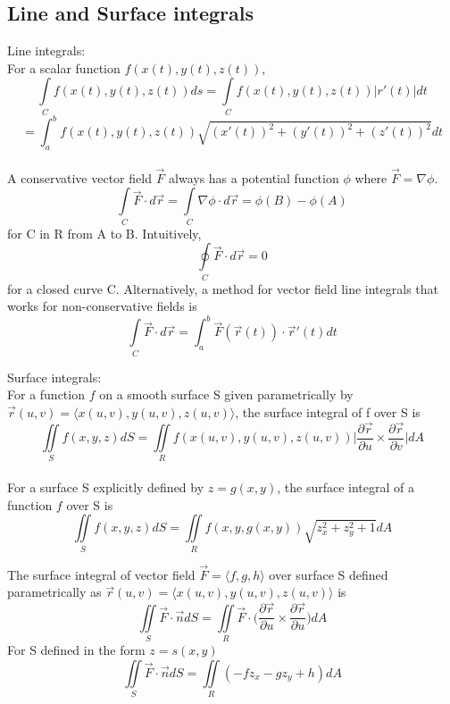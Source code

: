 \documentclass{article}
\begin{document}
\pagebreak
\subsection{Line and Surface integrals}
Line integrals:
\\For a scalar function $f(x(t),y(t),z(t))$,
$$\int \limits_C f(x(t),y(t),z(t)) ds = \int \limits_C f(x(t),y(t),z(t)) |r'(t)|dt$$ $$=\int_a^b f(x(t),y(t),z(t)) \sqrt{(x'(t))^2 +(y'(t))^2 + (z'(t))^2} dt$$
\\A conservative vector field $\vec F$ always has a potential function $\phi$ where $\vec F = \nabla \phi$. 
$$\int \limits_C \vec F \cdot d \vec r =  \int \limits_C \nabla \phi \cdot d \vec r = \phi(B) - \phi(A)$$
for C in R from A to B. Intuitively, 
$$\oint \limits_C \vec F \cdot d \vec r = 0$$
for a closed curve C. Alternatively, a method for vector field line integrals that works for non-conservative fields is
$$\int \limits_C \vec F \cdot d \vec r = \int_a^b \vec F(\vec r(t)) \cdot \vec r'(t) dt$$

Surface integrals:
\\For a function $f$ on a smooth surface S given parametrically by $\vec r(u,v) = \langle x(u,v), y(u,v), z(u,v) \rangle$, the surface integral of f over S is
$$\iint \limits_S f(x,y,z) dS = \iint \limits_R f(x(u,v),y(u,v),z(u,v)) \bigg| \frac{\partial \vec r}{\partial u} \times \frac{\partial \vec r}{\partial v} \bigg| dA$$
\\For a surface S explicitly defined by $z = g(x,y)$, the surface integral of a function $f$ over S is
$$\iint \limits_S f(x,y,z) dS = \iint \limits_R f(x,y,g(x,y)) \sqrt{z_x ^2 + z_y ^2 +1}dA$$

The surface integral of vector field $\vec F = \langle f,g,h \rangle$ over surface S defined parametrically as $\vec r (u,v)= \langle x(u,v), y(u,v), z(u,v) \rangle$ is 
$$\iint \limits_S \vec F \cdot \vec n dS = \iint \limits _R \vec F \cdot \bigg(\frac{\partial \vec r}{\partial u} \times \frac{\partial \vec r}{\partial u} \bigg) dA$$
For S defined in the form $z = s(x,y)$
$$\iint \limits_S \vec F \cdot \vec n dS = \iint \limits_R (-fz_x - gz_y + h) dA$$
\end{document}
